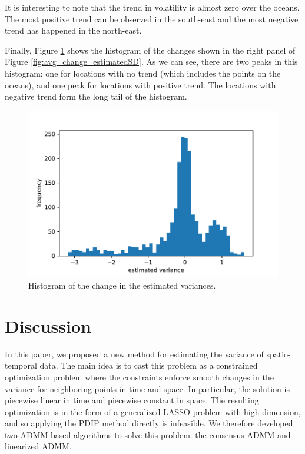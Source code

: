 \documentclass[review]{elsarticle}
\begin{document}
It is interesting to note that the trend in volatility is almost zero over the oceans. The most positive trend can be observed in the south-east and the most negative trend has happened in the north-east. 

Finally, Figure \ref{fig:hist_avg_change} shows the histogram of the changes shown in the right panel of Figure \ref{fig:avg_change_estimatedSD}. As we can see, there are two peaks in this histogram: one for locations with no trend (which includes the points on the oceans), and one peak for locations with positive trend. The locations with negative trend form the long tail of the histogram.

\begin{figure}[ht]
	\vskip 0.2in
	\begin{center}
		\centerline{\includegraphics[width=1\columnwidth]{Figures/hist_avg_change}}
		\caption{Histogram of the change in the estimated variances.}
		\label{fig:hist_avg_change}
	\end{center}
	\vskip -0.2in
\end{figure}
 

\section{Discussion}
In this paper, we proposed a new method for estimating the variance of spatio-temporal data. The main idea is to cast this problem as a constrained optimization problem where the constraints enforce smooth changes in the variance for neighboring points in time and space. In particular, the solution is piecewise linear in time and piecewise constant in space. The resulting optimization is in the form of a generalized LASSO problem with high-dimension, and so applying the PDIP method directly is infeasible. We therefore developed two ADMM-based algorithms to solve this problem: the consensus ADMM and linearized ADMM.
\end{document}
